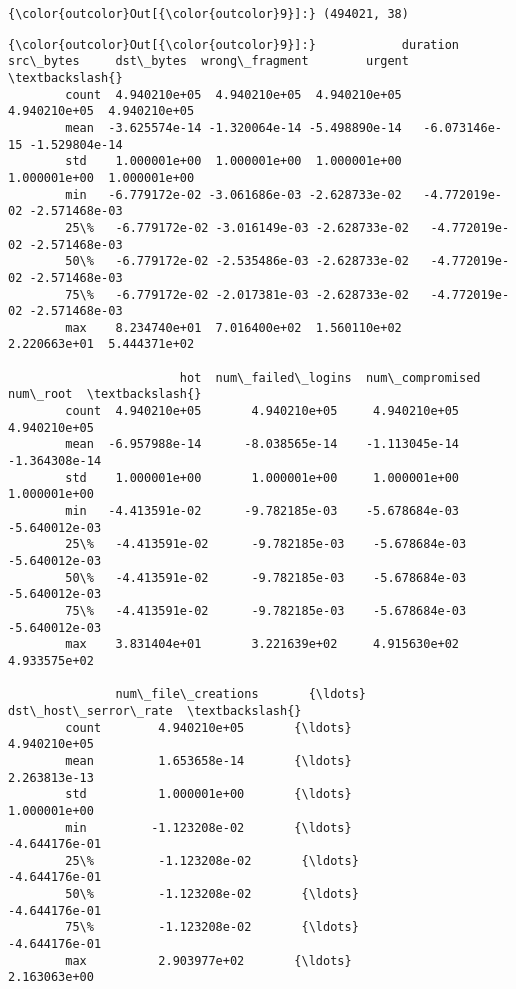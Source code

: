 \documentclass[11pt]{article}
\begin{document}
\begin{Verbatim}[commandchars=\\\{\}]
{\color{outcolor}Out[{\color{outcolor}9}]:} (494021, 38)
\end{Verbatim}
            
\begin{Verbatim}[commandchars=\\\{\}]
{\color{outcolor}Out[{\color{outcolor}9}]:}            duration     src\_bytes     dst\_bytes  wrong\_fragment        urgent  \textbackslash{}
        count  4.940210e+05  4.940210e+05  4.940210e+05    4.940210e+05  4.940210e+05   
        mean  -3.625574e-14 -1.320064e-14 -5.498890e-14   -6.073146e-15 -1.529804e-14   
        std    1.000001e+00  1.000001e+00  1.000001e+00    1.000001e+00  1.000001e+00   
        min   -6.779172e-02 -3.061686e-03 -2.628733e-02   -4.772019e-02 -2.571468e-03   
        25\%   -6.779172e-02 -3.016149e-03 -2.628733e-02   -4.772019e-02 -2.571468e-03   
        50\%   -6.779172e-02 -2.535486e-03 -2.628733e-02   -4.772019e-02 -2.571468e-03   
        75\%   -6.779172e-02 -2.017381e-03 -2.628733e-02   -4.772019e-02 -2.571468e-03   
        max    8.234740e+01  7.016400e+02  1.560110e+02    2.220663e+01  5.444371e+02   
        
                        hot  num\_failed\_logins  num\_compromised      num\_root  \textbackslash{}
        count  4.940210e+05       4.940210e+05     4.940210e+05  4.940210e+05   
        mean  -6.957988e-14      -8.038565e-14    -1.113045e-14 -1.364308e-14   
        std    1.000001e+00       1.000001e+00     1.000001e+00  1.000001e+00   
        min   -4.413591e-02      -9.782185e-03    -5.678684e-03 -5.640012e-03   
        25\%   -4.413591e-02      -9.782185e-03    -5.678684e-03 -5.640012e-03   
        50\%   -4.413591e-02      -9.782185e-03    -5.678684e-03 -5.640012e-03   
        75\%   -4.413591e-02      -9.782185e-03    -5.678684e-03 -5.640012e-03   
        max    3.831404e+01       3.221639e+02     4.915630e+02  4.933575e+02   
        
               num\_file\_creations       {\ldots}        dst\_host\_serror\_rate  \textbackslash{}
        count        4.940210e+05       {\ldots}                4.940210e+05   
        mean         1.653658e-14       {\ldots}                2.263813e-13   
        std          1.000001e+00       {\ldots}                1.000001e+00   
        min         -1.123208e-02       {\ldots}               -4.644176e-01   
        25\%         -1.123208e-02       {\ldots}               -4.644176e-01   
        50\%         -1.123208e-02       {\ldots}               -4.644176e-01   
        75\%         -1.123208e-02       {\ldots}               -4.644176e-01   
        max          2.903977e+02       {\ldots}                2.163063e+00   
        

\end{Verbatim}
\end{document}
